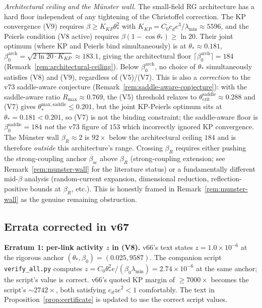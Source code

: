 \documentclass[11pt]{article}
\theoremstyle{definition}
\begin{document}
\emph{Architectural ceiling and the M\"unster wall.}  The small-field
RG architecture has a hard floor independent of any tightening of the
Christoffel correction.  The KP convergence (V9) requires
$\beta\ge K_{KP}\theta_*^2$ with $K_{KP}=C_0 c_d e^3/\lambda_{\min}\approx 5596$,
and the Peierls condition (V8 active) requires
$\beta(1-\cos\theta_*)\ge\ln 20$.  Their joint optimum (where
KP and Peierls bind simultaneously) is at $\theta_*\approx 0.181$,
$\beta_0^{\mathrm{arch}}=\sqrt{2\ln 20\cdot K_{KP}}\approx 183.1$,
giving the architectural floor $\lceil\beta_0^{\mathrm{arch}}\rceil=184$
\textup{(}Remark~\ref{rem:architectural-ceiling}\textup{)}.  Below
$\beta_0^{\mathrm{arch}}$, no choice of $\theta_*$ simultaneously
satisfies (V8) and (V9), regardless of (V5)/(V7).  This is also a
\emph{correction} to the v73 saddle-aware conjecture
\textup{(}Remark~\ref{rem:saddle-aware-conjecture}\textup{)}: with
the saddle-aware ratio $R_{\max}\approx 0.769$, the (V5) threshold
relaxes to $\theta_{\mathrm{crit}}^{\mathrm{saddle}}\approx 0.288$
and (V7) gives $\theta_*^{\mathrm{max,saddle}}\le 0.201$, but the
joint KP-Peierls optimum sits at $\theta_*=0.181<0.201$, so (V7) is
not the binding constraint; the saddle-aware floor is
$\beta_0^{\mathrm{saddle}}=184$ \emph{not} the v73 figure of $153$
which incorrectly ignored KP convergence.  The M\"unster wall
$\beta_R\approx 2$ is $92\times$ below the architectural ceiling
$184$ and is therefore \emph{outside} this architecture's range.
Crossing $\beta_R$ requires either pushing the strong-coupling anchor
$\beta_{\mathrm{sc}}$ above $\beta_R$
\textup{(}strong-coupling extension; see Remark~\ref{rem:munster-wall}
for the literature status\textup{)} or a fundamentally different mid-$\beta$
analysis \textup{(}random-current expansion, dimensional reduction,
reflection-positive bounds at $\beta_R$, etc.\textup{)}.  This is
honestly framed in Remark~\ref{rem:munster-wall} as the genuine
remaining obstruction.

\subsection{Errata corrected in v67}\label{subsec:errata-v67}

\textbf{Erratum 1: per-link activity $z$ in (V8).}  v66's text states
$z=1.0\times 10^{-6}$ at the rigorous anchor $(\theta_*,\beta_0)
=(0.025,9587)$.  The companion script \texttt{verify\_all.py}
computes $z=C_0\theta_*^2 e/(\beta_0\lambda_{\min})=2.74\times 10^{-6}$
at the same anchor; the script's value is correct.  v66's quoted KP
margin of $\ge 7000\times$ becomes the script's $\sim 2742\times$, both
satisfying $c_d z e^2<1$ comfortably.  The text in
Proposition~\ref{prop:certificate} is updated to use the correct
script values.
\end{document}
